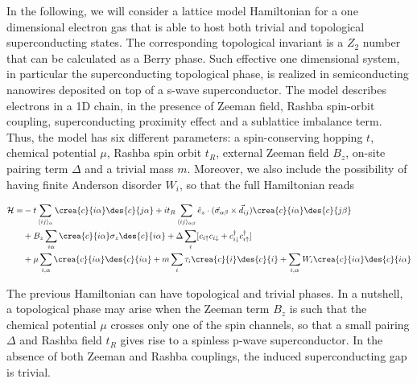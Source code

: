In the following, we will consider a lattice model Hamiltonian for a one
dimensional electron gas that is able to host both trivial and topological
superconducting states. The corresponding topological invariant is a $Z_2$
number that can be calculated as a Berry phase.\cite{PhysRevB.88.075419}
Such effective one dimensional system, in particular the superconducting
topological phase, is realized in semiconducting nanowires deposited on top of a
s-wave
superconductor.\cite{PhysRevLett.105.077001,PhysRevLett.105.177002,mourik2012signatures,PhysRevB.84.144522,PhysRevLett.106.127001,lutchyn2017realizing,aguado2017majorana}
The model describes electrons in a 1D chain, in the presence of Zeeman
field, Rashba spin-orbit coupling, superconducting proximity effect
and a sublattice imbalance term.
Thus, the model has six different parameters: a spin-conserving hopping $t$,
chemical potential $\mu$, Rashba spin orbit $t_R$, external Zeeman field $B_z$,
on-site pairing term $\Delta$ and a trivial mass $m$.
Moreover, we also include the possibility of having finite Anderson disorder
$W_i$,
so that the full Hamiltonian reads

\begin{equation}
\begin{split}
  \mathcal{H} =&-t\sum_{\langle ij\rangle_\alpha}
                \crea{c}{i\alpha}\des{c}{j\alpha}
                 + i t_R\sum_{\langle ij\rangle_{\alpha\beta}}
      \hat{e}_z\cdot(\vec{\sigma}_{\alpha\beta}\times\vec{d}_{ij})
                                           \crea{c}{i\alpha}\des{c}{j\beta}\\
      &+B_z\sum_{i\alpha}\crea{c}{i\alpha}\sigma_z\des{c}{i\alpha}
  +\Delta \sum_i [c_{i\uparrow} c_{i\downarrow} + c^\dagger_{i\downarrow} c^\dagger_{i\uparrow}]\\
  &+ \mu\sum_{i,\alpha}\crea{c}{i\alpha}\des{c}{i\alpha}
  +m\sum_{i}\tau_i\crea{c}{i}\des{c}{i}
  +\sum_{i,\alpha} W_i \crea{c}{i\alpha}\des{c}{i\alpha}
  \label{hamil1d}
\end{split}
\end{equation}

The previous Hamiltonian can have topological and trivial phases.
In a nutshell, a topological phase may arise when the Zeeman term $B_z$ is such
that the chemical potential $\mu$ crosses only one of the spin channels, so that
a small pairing $\Delta$ and Rashba field $t_R$ gives rise to a spinless p-wave
superconductor.\cite{PhysRevLett.106.127001}
In the absence of both Zeeman and Rashba couplings, the induced superconducting
gap is trivial.


